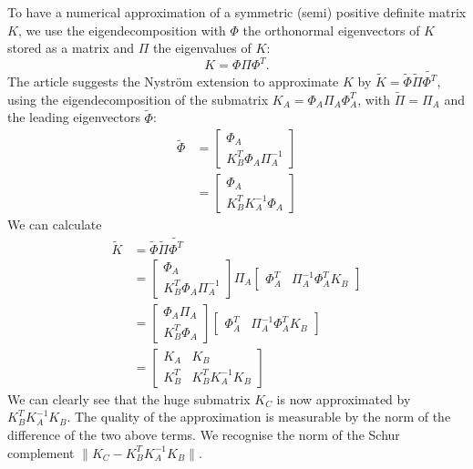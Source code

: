 To have a numerical approximation of a symmetric (semi) positive definite matrix \(K\), we use the eigendecomposition with \(\Phi\) the orthonormal eigenvectors of \(K\) stored as a matrix and \(\Pi\) the eigenvalues of \(K\):
\[K = \Phi \Pi \Phi^T.\]
The article \cite{fowlkes_spectral_2004} suggests the Nystr\"om extension to approximate \(K\) by \(\tilde{K} = \tilde{\Phi} \tilde{\Pi} \tilde{\Phi^T}\), using the eigendecomposition of the submatrix \(K_A = \Phi_A \Pi_A \Phi_A^T\), with \(\tilde{\Pi} = \Pi_A\) and the leading eigenvectors \(\tilde{\Phi}\):
\begin{equation}
 \begin{split}
  \tilde{\Phi} & = \begin{bmatrix}\Phi_A \\ K_B^T \Phi_A \Pi_A^{-1} \end{bmatrix} \\
               & = \begin{bmatrix}\Phi_A \\ K_B^T K_A^{-1} \Phi_A \end{bmatrix}
 \end{split}
\end{equation}
We can calculate
\begin{equation}
 \begin{split}
     \tilde{K} & = \tilde{\Phi} \tilde{\Pi} \tilde{\Phi^T} \\
               & = \begin{bmatrix} \Phi_A \\ K_B^T \Phi_A \Pi_A^{-1} \end{bmatrix} \Pi_A \begin{bmatrix} \Phi_A^T & \Pi_A^{-1} \Phi_A^T K_B \end{bmatrix} \\
               & = \begin{bmatrix} \Phi_A \Pi_A \\ K_B^T \Phi_A \end{bmatrix} \begin{bmatrix} \Phi_A^T & \Pi_A^{-1} \Phi_A^T K_B \end{bmatrix} \\
               & = \begin{bmatrix} K_A & K_B \\ K_B^T & K_B^T K_A^{-1} K_B \end{bmatrix}
 \end{split}
\end{equation}
We can clearly see that the huge submatrix \(K_C\) is now approximated by \(K_B^T K_A^{-1} K_B\).
The quality of the approximation is measurable by the norm of the difference of the two above terms.
We recognise the norm of the Schur complement \(\| K_C - K_B^T K_A^{-1} K_B \| \).

